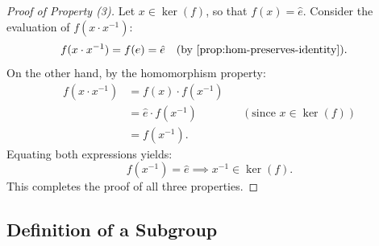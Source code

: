 \begin{content}

\begin{proof}[Proof of Property (3)]
Let $x \in \operatorname{ker}(f)$, so that $f(x) = \hat{e}$. Consider the evaluation of $f(x \cdot x^{-1})$:
\begin{align*}
f(x \cdot x^{-1}) &= f(e) = \hat{e} && (\text{by \cref{prop:hom-preserves-identity}}).
\end{align*}
On the other hand, by the homomorphism property:
\begin{align*}
f(x \cdot x^{-1}) &= f(x) \cdot f(x^{-1}) \\
&= \hat{e} \cdot f(x^{-1}) && (\text{since } x \in \operatorname{ker}(f)) \\
&= f(x^{-1}).
\end{align*}
Equating both expressions yields:
\[
f(x^{-1}) = \hat{e} \implies x^{-1} \in \operatorname{ker}(f).
\]
This completes the proof of all three properties.
\end{proof}
\end{content}

\subsection{Definition of a Subgroup}

